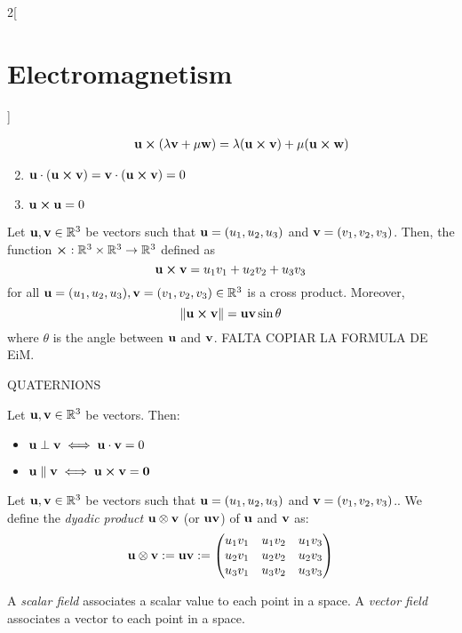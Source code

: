\documentclass[../../../main.tex]{subfiles}
\begin{document}
\begin{multicols}{2}[\section{Electromagnetism}]
\begin{definition}
\begin{enumerate}
\begin{gather*}
              \vectorfunction{u}\crossprod(\lambda\vectorfunction{v}+\mu\vectorfunction{w})=\lambda(\vectorfunction{u}\crossprod\vectorfunction{v})+\mu(\vectorfunction{u}\crossprod\vectorfunction{w})
            \end{gather*}
      \item $\vectorfunction{u}\cdot(\vectorfunction{u}\crossprod\vectorfunction{v})=\vectorfunction{v}\cdot(\vectorfunction{u}\crossprod\vectorfunction{v})=0$
      \item $\vectorfunction{u}\crossprod\vectorfunction{u}=0$
    \end{enumerate}
  \end{definition}
  \begin{prop}
    Let $\boldsymbol{\mathrm{u}},\boldsymbol{\mathrm{v}}\in\mathbb{R}^3$ be vectors such that $\boldsymbol{\mathrm{u}}=(u_1,u_2,u_3)$ and $\boldsymbol{\mathrm{v}}=(v_1,v_2,v_3)$. Then, the function $\crossprod:\RR^3\times\RR^3\rightarrow\RR^3$ defined as $$\vectorfunction{u}\crossprod\vectorfunction{v}=
      u_1v_1+u_2v_2+u_3v_3$$ for all $\boldsymbol{\mathrm{u}}=(u_1,u_2,u_3),\boldsymbol{\mathrm{v}}=(v_1,v_2,v_3)\in\mathbb{R}^3$ is a cross product. Moreover, $$\|\vectorfunction{u}\crossprod\vectorfunction{v}\|=\vectorfunction{u}\vectorfunction{v}\sin\theta$$ where $\theta$ is the angle between $\boldsymbol{\mathrm{u}}$ and $\boldsymbol{\mathrm{v}}$. FALTA COPIAR LA FORMULA DE EiM.
  \end{prop}
  QUATERNIONS
  \begin{prop}
    Let $\boldsymbol{\mathrm{u}},\boldsymbol{\mathrm{v}}\in\mathbb{R}^3$ be vectors. Then:
    \begin{itemize}
      \item $\boldsymbol{\mathrm{u}}\perp\boldsymbol{\mathrm{v}}\iff\boldsymbol{\mathrm{u}}\cdot\boldsymbol{\mathrm{v}}=0$
      \item $\vectorfunction{u}\parallel\vectorfunction{v}\iff\vectorfunction{u}\crossprod\vectorfunction{v}=\vectorfunction{0}$
    \end{itemize}
  \end{prop}
  \begin{definition}
    Let $\boldsymbol{\mathrm{u}},\boldsymbol{\mathrm{v}}\in\mathbb{R}^3$ be vectors such that $\boldsymbol{\mathrm{u}}=(u_1,u_2,u_3)$ and $\boldsymbol{\mathrm{v}}=(v_1,v_2,v_3)$.. We define the \textit{dyadic product $\boldsymbol{\mathrm{u}}\otimes\boldsymbol{\mathrm{v}}$} (or $\boldsymbol{\mathrm{u}}\boldsymbol{\mathrm{v}}$) of $\boldsymbol{\mathrm{u}}$ and $\boldsymbol{\mathrm{v}}$ as: $$\boldsymbol{\mathrm{u}}\otimes\boldsymbol{\mathrm{v}}:=\boldsymbol{\mathrm{u}}\boldsymbol{\mathrm{v}}:=
      \begin{pmatrix}
        u_1v_1 & u_1v_2 & u_1v_3 \\
        u_2v_1 & u_2v_2 & u_2v_3 \\
        u_3v_1 & u_3v_2 & u_3v_3 \\
      \end{pmatrix}$$
  \end{definition}
  \begin{definition}
    A \textit{scalar field} associates a scalar value to each point in a space.
    A \textit{vector field} associates a vector to each point in a space.
  \end{definition}

\end{multicols}
\end{document}
